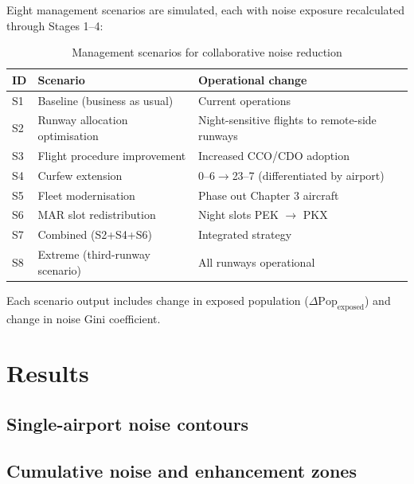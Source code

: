 \documentclass[review,12pt]{elsarticle}
\begin{document}
Eight management scenarios are simulated, each with noise exposure recalculated through Stages 1--4:

\begin{table}[h]
\centering
\caption{Management scenarios for collaborative noise reduction}
\label{tab:scenarios}
\begin{tabular}{@{}lll@{}}
\toprule
ID & Scenario & Operational change \\
\midrule
S1 & Baseline (business as usual) & Current operations \\
S2 & Runway allocation optimisation & Night-sensitive flights to remote-side runways \\
S3 & Flight procedure improvement & Increased CCO/CDO adoption \\
S4 & Curfew extension & 0--6$\rightarrow$23--7 (differentiated by airport) \\
S5 & Fleet modernisation & Phase out Chapter 3 aircraft \\
S6 & MAR slot redistribution & Night slots PEK $\rightarrow$ PKX \\
S7 & Combined (S2+S4+S6) & Integrated strategy \\
S8 & Extreme (third-runway scenario) & All runways operational \\
\bottomrule
\end{tabular}
\end{table}

Each scenario output includes change in exposed population ($\Delta \text{Pop}_{\text{exposed}}$) and change in noise Gini coefficient.

\section{Results}
\label{sec:results}


\subsection{Single-airport noise contours}


\subsection{Cumulative noise and enhancement zones}
\end{document}
